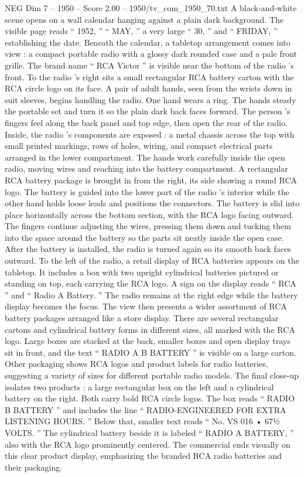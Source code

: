 \begin{textsample}{NEG Dim 7 – 1950 – Score 2.00 – 1950/tv\_com\_1950\_70.txt}  \label{ex:f7_neg_082}
A black-and-white scene opens on a wall calendar hanging against a plain dark background.
The visible page reads “ 1952, ” “ MAY, ” a very large “ 30, ” and “ FRIDAY, ” establishing the date.
Beneath the calendar, a tabletop arrangement comes into view : a compact portable radio with a glossy dark rounded case and a pale front grille.
The brand name “ RCA Victor ” is visible near the bottom of the radio ’s front.
To the radio ’s right sits a small rectangular RCA battery carton with the RCA circle logo on its face.
A pair of adult hands, seen from the wrists down in suit sleeves, begins handling the radio.
One hand wears a ring.
The hands steady the portable set and turn it so the plain dark back faces forward.
The person ’s fingers feel along the back panel and top edge, then open the rear of the radio.
Inside, the radio ’s components are exposed : a metal chassis across the top with small printed markings, rows of holes, wiring, and compact electrical parts arranged in the lower compartment.
The hands work carefully inside the open radio, moving wires and reaching into the battery compartment.
A rectangular RCA battery package is brought in from the right, its side showing a round RCA logo.
The battery is guided into the lower part of the radio ’s interior while the other hand holds loose leads and positions the connectors.
The battery is slid into place horizontally across the bottom section, with the RCA logo facing outward.
The fingers continue adjusting the wires, pressing them down and tucking them into the space around the battery so the parts sit neatly inside the open case.
After the battery is installed, the radio is turned again so its smooth back faces outward.
To the left of the radio, a retail display of RCA batteries appears on the tabletop.
It includes a box with two upright cylindrical batteries pictured or standing on top, each carrying the RCA logo.
A sign on the display reads “ RCA ” and “ Radio A Battery. ” The radio remains at the right edge while the battery display becomes the focus.
The view then presents a wider assortment of RCA battery packages arranged like a store display.
There are several rectangular cartons and cylindrical battery forms in different sizes, all marked with the RCA logo.
Large boxes are stacked at the back, smaller boxes and open display trays sit in front, and the text “ RADIO A B BATTERY ” is visible on a large carton.
Other packaging shows RCA logos and product labels for radio batteries, suggesting a variety of sizes for different portable radio models.
The final close-up isolates two products : a large rectangular box on the left and a cylindrical battery on the right.
Both carry bold RCA circle logos.
The box reads “ RADIO B BATTERY ” and includes the line “ RADIO-ENGINEERED FOR EXTRA LISTENING HOURS. ” Below that, smaller text reads “ No.
VS 016 • 67½ VOLTS. ” The cylindrical battery beside it is labeled “ RADIO A BATTERY, ” also with the RCA logo prominently centered.
The commercial ends visually on this clear product display, emphasizing the branded RCA radio batteries and their packaging.

\end{textsample}
